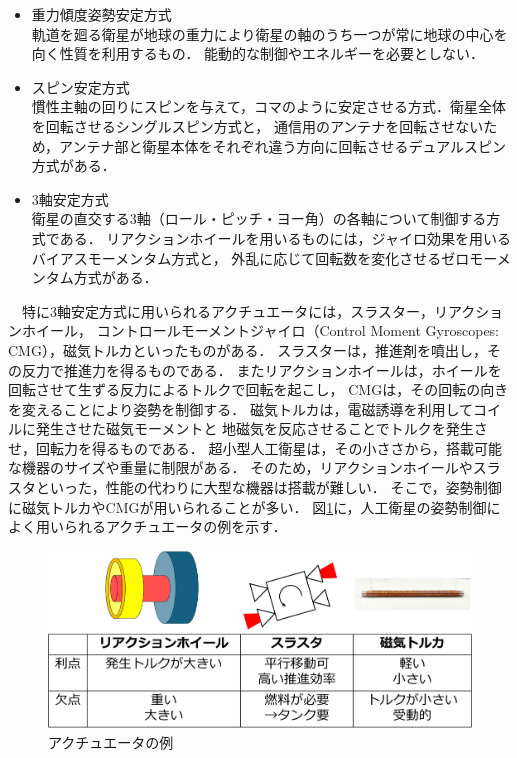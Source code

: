 \begin{itemize}
    \item 重力傾度姿勢安定方式\\
    軌道を廻る衛星が地球の重力により衛星の軸のうち一つが常に地球の中心を向く性質を利用するもの．
    能動的な制御やエネルギーを必要としない\cite{intro4}．
    \item スピン安定方式\\
    慣性主軸の回りにスピンを与えて，コマのように安定させる方式．衛星全体を回転させるシングルスピン方式と，
    通信用のアンテナを回転させないため，アンテナ部と衛星本体をそれぞれ違う方向に回転させるデュアルスピン方式がある\cite{intro5}．
    \item 3軸安定方式\\
    衛星の直交する3軸（ロール・ピッチ・ヨー角）の各軸について制御する方式である．
    リアクションホイールを用いるものには，ジャイロ効果を用いるバイアスモーメンタム方式と，
    外乱に応じて回転数を変化させるゼロモーメンタム方式がある\cite{intro5}．
\end{itemize}

　特に3軸安定方式に用いられるアクチュエータには，スラスター，リアクションホイール，
コントロールモーメントジャイロ（Control Moment Gyroscopes: CMG），磁気トルカといったものがある．
スラスターは，推進剤を噴出し，その反力で推進力を得るものである．
またリアクションホイールは，ホイールを回転させて生ずる反力によるトルクで回転を起こし，
CMGは，その回転の向きを変えることにより姿勢を制御する．
磁気トルカは，電磁誘導を利用してコイルに発生させた磁気モーメントと
地磁気を反応させることでトルクを発生させ，回転力を得るものである．
超小型人工衛星は，その小ささから，搭載可能な機器のサイズや重量に制限がある．
そのため，リアクションホイールやスラスタといった，性能の代わりに大型な機器は搭載が難しい．
そこで，姿勢制御に磁気トルカやCMGが用いられることが多い．
図\ref{fig:act}に，人工衛星の姿勢制御によく用いられるアクチュエータの例を示す．

\begin{figure}[H]
	\centering
		\includegraphics[scale=0.5]{./figure/序論図-crop.pdf}
		\caption{アクチュエータの例}
		\label{fig:act}
\end{figure}


